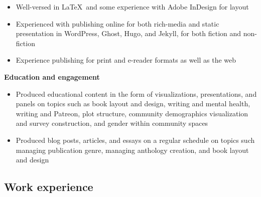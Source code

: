 \begin{itemize}
  \item Well-versed in \LaTeX\ and some experience with Adobe InDesign for layout
  \item Experienced with publishing online for both rich-media and static presentation in WordPress, Ghost, Hugo, and Jekyll, for both fiction and non-fiction
  \item Experience publishing for print and e-reader formats as well as the web
\end{itemize}

\hspace{-1.5em}\textbf{Education and engagement}

\begin{itemize}
    \item Produced educational content in the form of visualizations, presentations, and panels on topics such as book layout and design, writing and mental health, writing and Patreon, plot structure, community demographics visualization and survey construction, and gender within community spaces
    \item Produced blog posts, articles, and essays on a regular schedule on topics such managing publication genre, managing anthology creation, and book layout and design
\end{itemize}

\subsection{Work experience}

